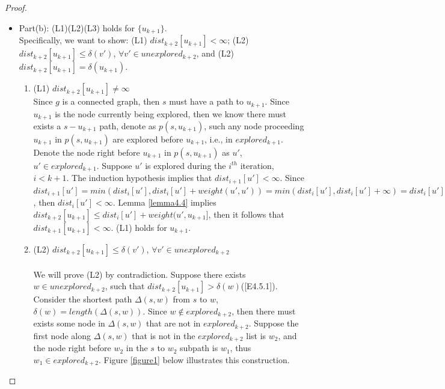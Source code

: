 \begin{proof}
\begin{itemize}
  \\\\
  \texttt{Proof of (L1)}: Since the induction hypothesis implies that $\forall q \in explored_{k+1}, dist_{k+1}[q] < \infty$, and the proof of (L3) above shows that $dist_{k+2}[q] = dist_{k+1}[q]$, then $dist_{k+2}[q] < \infty$. (L1) holds for $explored_{k+1}$.
  \\\\
  Hence we have proved that both (1) and (2) holds for all nodes in $explored_{k+1}$.

  \item Part(b): (L1)(L2)(L3) holds for $\{u_{k+1}\}$. 
  \\
  Specifically, we want to show: (L1) $dist_{k+2}[u_{k+1}] < \infty$; (L2) $dist_{k+2}[u_{k+1}] \leq \delta(v')$, $\forall v' \in unexplored_{k+2}$, and (L2) $dist_{k+2}[u_{k+1}] = \delta(u_{k+1})$. 


  \begin{enumerate}
  \item (L1) $dist_{k+2}[u_{k+1}] \neq \infty$
  \\
  Since $g$ is a connected graph, then $s$ must have a path to $u_{k+1}$. Since $u_{k+1}$ is the node currently being explored, then we know there must exists a $s-u_{k+1}$ path, denote as $p(s, u_{k+1})$, such any node proceeding $u_{k+1}$ in $p(s, u_{k+1})$ are explored before $u_{k+1}$, i.e., in $explored_{k+1}$. 
  \\
  Denote the node right before $u_{k+1}$ in $p(s, u_{k+1})$ as $u'$, $u' \in explored_{k+1}$. Suppose $u'$ is explored during the $i^{th}$ iteration, $i < k+1$. The induction hypothesis implies that $dist_{i+1}[u'] < \infty$. Since $dist_{i+1}[u'] = min(dist_i[u'], dist_i[u'] + weight(u', u')) = min(dist_i[u'], dist_i[u'] + \infty) = dist_i[u']$, then $ dist_i[u'] < \infty$. Lemma \ref{lemma4.4} implies $dist_{k+2}[u_{k+1}] \leq dist_i[u'] + weight(u', u_{k+1}]$, then it follows that $dist_{k+1}[u_{k+1}] < \infty$. (L1) holds for $u_{k+1}$. 
  \\
  \item (L2) $dist_{k+2}[u_{k+1}] \leq \delta(v')$, $\forall v' \in unexplored_{k+2}$
  \\\\
  We will prove (L2) by contradiction. Suppose there exists $w \in unexplored_{k+2}$, such that $dist_{k+2}[u_{k+1}] > \delta(w)$([E4.5.1]). 
  \\
  Consider the shortest path $\Delta(s, w)$ from $s$ to $w$, $\delta(w) = length(\Delta(s, w))$. Since $w \notin explored_{k+2}$, then there must exists some node in $\Delta(s, w)$ that are not in $explored_{k+2}$. Suppose the first node along $\Delta(s, w)$ that is not in the $explored_{k+2}$ list is $w_2$, and the node right before $w_2$ in the $s$ to $w_2$ subpath is $w_1$, thus $w_1 \in explored_{k+2}$. Figure \ref{figure1} below illustrates this construction. 
  

\end{enumerate}
\end{itemize}
\end{proof}
